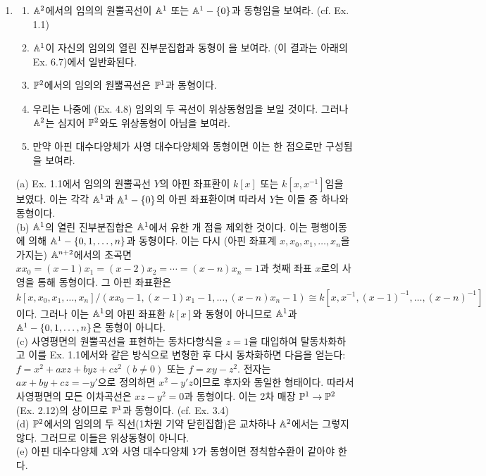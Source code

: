 	\begin{enumerate}[label=\tb{3.\arabic*.},itemindent=0mm,itemsep=4mm]
		\item \begin{enumerate}[label=(\alph*)]
			\item $\mathbb{A}^2$에서의 임의의 원뿔곡선이 $\mathbb{A}^1$ 또는 $\mathbb{A}^1-\{0\}$과 동형임을 보여라. (cf. Ex. 1.1)
			\item $\mathbb{A}^1$이 자신의 임의의 열린 진부분집합과 동형이 을 보여라.
			(이 결과는 아래의 Ex. 6.7)에서 일반화된다.
			\item $\mathbb{P}^2$에서의 임의의 원뿔곡선은 $\mathbb{P}^1$과 동형이다.
			\item 우리는 나중에 (Ex. 4.8) 임의의 두 곡선이 위상동형임을 보일 것이다.
			그러나 $\mathbb{A}^2$는 심지어 $\mathbb{P}^2$와도 위상동형이 아님을 보여라.
			\item 만약 아핀 대수다양체가 사영 대수다양체와 동형이면 이는 한 점으로만 구성됨을 보여라.
		\end{enumerate}
		\sol (a) Ex. 1.1에서 임의의 원뿔곡선 $Y$의 아핀 좌표환이 $k[x]$ 또는 $k[x,x^{-1}]$임을 보였다.
		이는 각각 $\mathbb{A}^1$과 $\mathbb{A}^1-\{0\}$의 아핀 좌표환이며 따라서 $Y$는 이들 중 하나와 동형이다.\\
		(b) $\mathbb{A}^1$의 열린 진부분집합은 $\mathbb{A}^1$에서 유한 개 점을 제외한 것이다.
		이는 평행이동에 의해 $\mathbb{A}^1-\{0,1,\ldots,n\}$과 동형이다. 이는 다시 (아핀 좌표계 $x,x_0,x_1,\ldots,x_n$을 가지는)
		$\mathbb{A}^{n+2}$에서의 초곡면 $xx_0=(x-1)x_1=(x-2)x_2=\cdots=(x-n)x_n=1$과 첫째 좌표 $x$로의 사영을 통해 동형이다.
		그 아핀 좌표환은 $k[x,x_0,x_1,\ldots,x_n]/(xx_0-1,(x-1)x_1-1,\ldots,(x-n)x_n-1)
		\cong k[x,x^{-1},(x-1)^{-1},\ldots,(x-n)^{-1}]$이다.
		그러나 이는 $\mathbb{A}^1$의 아핀 좌표환 $k[x]$와 동형이 아니므로 $\mathbb{A}^1$과 $\mathbb{A}^1-\{0,1,\ldots,n\}$은 동형이 아니다.\\
		(c) 사영평면의 원뿔곡선을 표현하는 동차다항식을 $z=1$을 대입하여 탈동차화하고 이를 Ex. 1.1에서와 같은 방식으로 변형한 후
		다시 동차화하면 다음을 얻는다: $f=x^2+axz+byz+cz^2\:(b\ne 0)$ 또는 $f=xy-z^2$.
		전자는 $ax+by+cz=-y'$으로 정의하면 $x^2-y'z$이므로 후자와 동일한 형태이다.
		따라서 사영평면의 모든 이차곡선은 $xz-y^2=0$과 동형이다.
		이는 2차 매장 $\mathbb{P}^1\rightarrow\mathbb{P}^2$(Ex. 2.12)의 상이므로 $\mathbb{P}^1$과 동형이다. (cf. Ex. 3.4)\\
		(d) $\mathbb{P}^2$에서의 임의의 두 직선(1차원 기약 닫힌집합)은 교차하나 $\mathbb{A}^2$에서는 그렇지 않다.
		그러므로 이들은 위상동형이 아니다.\\
		(e) 아핀 대수다양체 $X$와 사영 대수다양체 $Y$가 동형이면 정칙함수환이 같아야 한다.

\end{enumerate}
